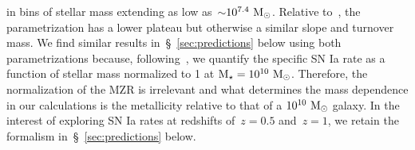 \documentclass[ms.tex]{subfiles}
\begin{document}
in bins of stellar mass extending as low as~$\sim$$10^{7.4}~\text{M}_\odot$.
Relative to~\citet{Zahid2014}, the~\citet{Andrews2013} parametrization has a
lower plateau but otherwise a similar slope and turnover mass.
We find similar results in~\S~\ref{sec:predictions} below using both
parametrizations because, following~\citet{Brown2019}, we quantify the specific
SN Ia rate as a function of stellar mass normalized to 1 at
$\text{M}_\star = 10^{10}~\text{M}_\odot$.
Therefore, the normalization of the MZR is irrelevant and what determines the
mass dependence in our calculations is the metallicity relative to that of a
$10^{10}~\text{M}_\odot$ galaxy.
In the interest of exploring SN Ia rates at redshifts of~$z = 0.5$ and~$z = 1$,
we retain the~\citet{Zahid2014} formalism in~\S~\ref{sec:predictions} below.
\end{document}

